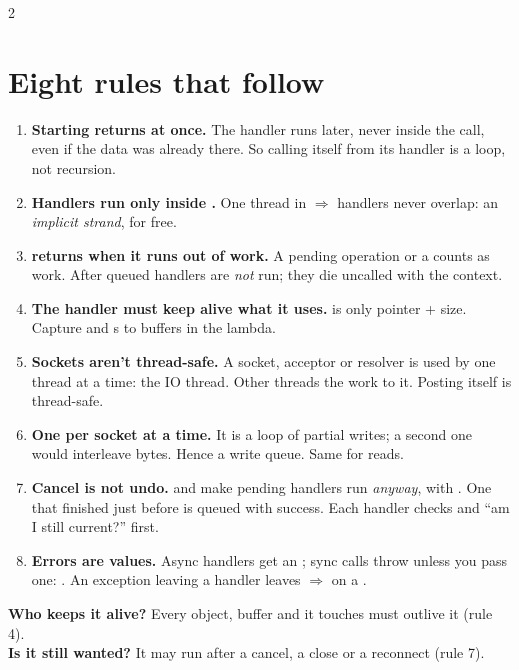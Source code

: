\begin{multicols}{2}
\section{Eight rules that follow}
\begin{enumerate}[leftmargin=12pt, itemsep=2.5pt]
	\item \textbf{Starting returns at once.} The handler runs later, never inside the  call, even if the data was already there. So  calling itself from its handler is a loop, not recursion.
	\item \textbf{Handlers run only inside .} One thread in  $\Rightarrow$ handlers never overlap: an \emph{implicit strand}, for free.
	\item \textbf{ returns when it runs out of work.} A pending operation or a  counts as work. After  queued handlers are \emph{not} run; they die uncalled with the context.
	\item \textbf{The handler must keep alive what it uses.}  is only pointer + size. Capture  and s to buffers in the lambda.
	\item \textbf{Sockets aren't thread-safe.} A socket, acceptor or resolver is used by one thread at a time: the IO thread. Other threads  the work to it. Posting itself is thread-safe.
	\item \textbf{One  per socket at a time.} It is a loop of partial writes; a second one would interleave bytes. Hence a write queue. Same for reads.
	\item \textbf{Cancel is not undo.}  and  make pending handlers run \emph{anyway}, with . One that finished just before is queued with success. Each handler checks  and ``am I still current?'' first.
	\item \textbf{Errors are values.} Async handlers get an ; sync calls throw unless you pass one: . An exception leaving a handler leaves  $\Rightarrow$  on a .
\end{enumerate}

\columnbreak
\begin{keybox}
	\textbf{Who keeps it alive?} Every object, buffer and  it touches must outlive it (rule 4).\\
	\textbf{Is it still wanted?} It may run after a cancel, a close or a reconnect (rule 7).
\end{keybox}


\end{multicols}
